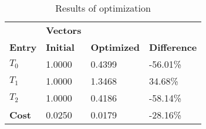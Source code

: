 \begin{table}[h!]
\centering
\begin{tabular}{llll}
\textbf{}      & \cellcolor[HTML]{EFEFEF}\textbf{Vectors} & \textbf{} & \textbf{}         \\
\rowcolor[HTML]{EFEFEF} 
\textbf{Entry} & \textbf{Initial} & \textbf{Optimized} & \textbf{Difference} \\
$T_0$ & 1.0000 & 0.4399 & -56.01\% \\ 
$T_1$ & 1.0000 & 1.3468 & 34.68\% \\ 
$T_2$ & 1.0000 & 0.4186 & -58.14\% \\ 
\rowcolor[HTML]{EFEFEF} 
\textbf{Cost}  & 0.0250 & 0.0179 & -28.16\% \\ 
\end{tabular}
\caption{Results of optimization}
\label{tab:OptimizationAnalysis}
\end{table}